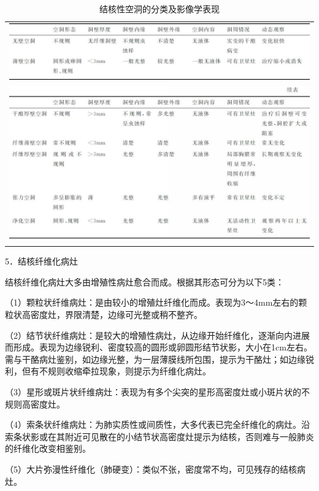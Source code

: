 \begin{longtable}{c}
  \caption{结核性空洞的分类及影像学表现}
  \label{tab9-5}\\
  \endfirsthead
  \caption[]{结核性空洞的分类及影像学表现}
  \endhead
\includegraphics[width=\textwidth,height=\textheight,keepaspectratio]{./images/Image00206.jpg}\\
\includegraphics[width=\textwidth,height=\textheight,keepaspectratio]{./images/Image00207.jpg}
\end{longtable}



5．结核纤维化病灶

结核纤维化病灶大多由增殖性病灶愈合而成。根据其形态可分为以下5类：

（1）颗粒状纤维病灶：是由较小的增殖灶纤维化而成。表现为3～4mm左右的颗粒状高密度灶，界限清楚，边缘可光整或稍不整齐。

（2）结节状纤维病灶：是较大的增殖性病灶，从边缘开始纤维化，逐渐向内进展而形成。表现为边缘锐利、密度较高的圆形或卵圆形结节状影，大小在1cm左右。需与干酪病灶鉴别，如边缘光整，为一层薄膜线所包围，提示为干酪灶；如边缘锐利，但有不规则收缩牵拉现象，则提示为纤维化病灶。

（3）星形或斑片状纤维病灶：表现为有多个尖突的星形高密度灶或小斑片状的不规则高密度灶。

（4）索条状纤维病灶：为肺实质性或间质性，大多代表已完全纤维化的病灶。沿索条状影或在其附近可见散在的小结节状高密度灶提示为结核，否则难与一般肺炎的纤维化改变相鉴别。

（5）大片弥漫性纤维化（肺硬变）：类似不张，密度常不均，可见残存的结核病灶。


